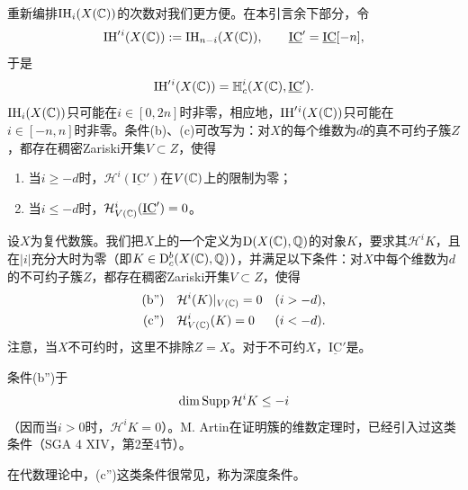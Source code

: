 重新编排$\mathrm{IH}_i(X(\mathbb C))$的次数对我们更方便。在本引言余下部分，令
\[
\mathrm{IH}'{}^i(X(\mathbb C)):=\mathrm{IH}_{n-i}(X(\mathbb C)),
\qquad \underline{\mathrm{IC}}'=\underline{\mathrm{IC}}[-n],
\]
于是
\[
\mathrm{IH}'{}^i(X(\mathbb C))=\mathbb H_c^i(X(\mathbb C),\underline{\mathrm{IC}}').
\]
$\mathrm{IH}_i(X(\mathbb C))$只可能在$i\in[0,2n]$时非零，相应地，$\mathrm{IH}'{}^i(X(\mathbb C))$只可能在$i\in[-n,n]$时非零。条件(b)、(c)可改写为：对$X$的每个维数为$d$的真不可约子簇$Z$，都存在稠密Zariski开集$V\subset Z$，使得
\begin{enumerate}[label=\textup{(\alph*')} ,start=2]
\item 当$i\geq-d$时，$\mathcal H^i(\underline{\mathrm{IC}}')$在$V(\mathbb C)$上的限制为零；
\item 当$i\leq-d$时，$\mathcal H^i_{V(\mathbb C)}(\underline{\mathrm{IC}}')=0$。
\end{enumerate}

设$X$为复代数簇。我们把$X$上的一个定义为$\mathrm{D}(X(\mathbb C),\mathbb Q)$的对象$K$，要求其$\mathcal H^iK$，且在$|i|$充分大时为零（即$K\in\mathrm{D}_c^b(X(\mathbb C),\mathbb Q)$），并满足以下条件：对$X$中每个维数为$d$的不可约子簇$Z$，都存在稠密Zariski开集$V\subset Z$，使得
\begin{align*}
\text{(b'')}\quad &\mathcal H^i(K)|_{V(\mathbb C)}=0 &&(i>-d),\\
\text{(c'')}\quad &\mathcal H^i_{V(\mathbb C)}(K)=0 &&(i<-d).
\end{align*}
注意，当$X$不可约时，这里不排除$Z=X$。对于不可约$X$，$\underline{\mathrm{IC}}'$是。

条件(b'')于
\[
\dim\operatorname{Supp}\mathcal H^iK\leq-i
\]
（因而当$i>0$时，$\mathcal H^iK=0$）。M. Artin在证明簇的维数定理时，已经引入过这类条件（SGA 4 XIV，第2至4节）。

在代数理论中，(c'')这类条件很常见，称为深度条件。

